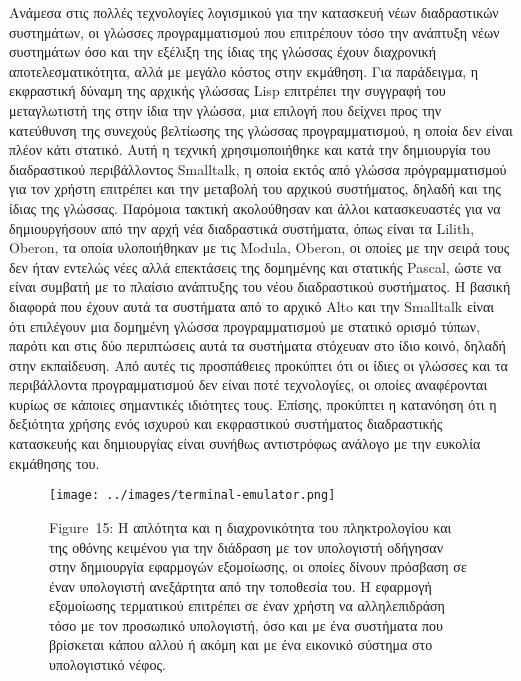 \documentclass[
]{article}
\begin{document}
Ανάμεσα στις πολλές τεχνολογίες λογισμικού για την κατασκευή νέων
διαδραστικών συστημάτων, οι γλώσσες προγραμματισμού που επιτρέπουν τόσο
την ανάπτυξη νέων συστημάτων όσο και την εξέλιξη της ίδιας της γλώσσας
έχουν διαχρονική αποτελεσματικότητα, αλλά με μεγάλο κόστος στην
εκμάθηση. Για παράδειγμα, η εκφραστική δύναμη της αρχικής γλώσσας Lisp
επιτρέπει την συγγραφή του μεταγλωτιστή της στην ίδια την γλώσσα, μια
επιλογή που δείχνει προς την κατεύθυνση της συνεχούς βελτίωσης της
γλώσσας προγραμματισμού, η οποία δεν είναι πλέον κάτι στατικό. Αυτή η
τεχνική χρησιμοποιήθηκε και κατά την δημιουργία του διαδραστικού
περιβάλλοντος Smalltalk, η οποία εκτός από γλώσσα πρόγραμματισμού για
τον χρήστη επιτρέπει και την μεταβολή του αρχικού συστήματος, δηλαδή και
της ίδιας της γλώσσας. Παρόμοια τακτική ακολούθησαν και άλλοι
κατασκευαστές για να δημιουργήσουν από την αρχή νέα διαδραστικά
συστήματα, όπως είναι τα Lilith, Oberon, τα οποία υλοποιήθηκαν με τις
Modula, Oberon, οι οποίες με την σειρά τους δεν ήταν εντελώς νέες αλλά
επεκτάσεις της δομημένης και στατικής Pascal, ώστε να είναι συμβατή με
το πλαίσιο ανάπτυξης του νέου διαδραστικού συστήματος. Η βασική διαφορά
που έχουν αυτά τα συστήματα από το αρχικό Alto και την Smalltalk είναι
ότι επιλέγουν μια δομημένη γλώσσα προγραμματισμού με στατικό ορισμό
τύπων, παρότι και στις δύο περιπτώσεις αυτά τα συστήματα στόχευαν στο
ίδιο κοινό, δηλαδή στην εκπαίδευση. Από αυτές τις προσπάθειες προκύπτει
ότι οι ίδιες οι γλώσσες και τα περιβάλλοντα προγραμματισμού δεν είναι
ποτέ τεχνολογίες, οι οποίες αναφέρονται κυρίως σε κάποιες σημαντικές
ιδιότητες τους. Επίσης, προκύπτει η κατανόηση ότι η δεξιότητα χρήσης
ενός ισχυρού και εκφραστικού συστήματος διαδραστικής κατασκευής και
δημιουργίας είναι συνήθως αντιστρόφως ανάλογο με την ευκολία εκμάθησης
του.

\leavevmode{}%
\begin{figure}
\hypertarget{fig:terminal-emulator}{%
\centering
\texttt{[image: ../images/terminal-emulator.png]}
\caption{Figure~15: Η απλότητα και η διαχρονικότητα του πληκτρολογίου
και της οθόνης κειμένου για την διάδραση με τον υπολογιστή οδήγησαν στην
δημιουργία εφαρμογών εξομοίωσης, οι οποίες δίνουν πρόσβαση σε έναν
υπολογιστή ανεξάρτητα από την τοποθεσία του. Η εφαρμογή εξομοίωσης
τερματικού επιτρέπει σε έναν χρήστη να αλληλεπιδράση τόσο με τον
προσωπικό υπολογιστή, όσο και με ένα συστήματα που βρίσκεται κάπου αλλού
ή ακόμη και με ένα εικονικό σύστημα στο υπολογιστικό
νέφος.}\label{fig:terminal-emulator}
}
\end{figure}
\end{document}
